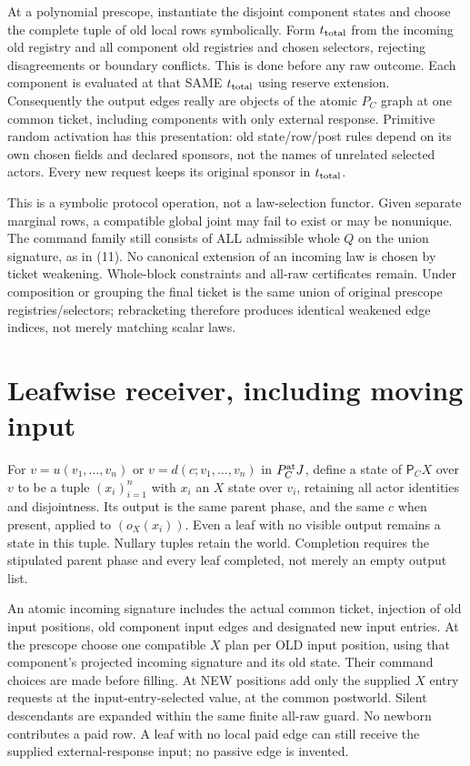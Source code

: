 \documentclass[11pt]{article}
\begin{document}
At a polynomial prescope, instantiate the disjoint component states and choose the complete tuple of old local rows symbolically. Form $t_{\rm total}$ from the incoming old registry and all component old registries and chosen selectors, rejecting disagreements or boundary conflicts. This is done before any raw outcome. Each component is evaluated at that SAME $t_{\rm total}$ using reserve extension. Consequently the output edges really are objects of the atomic $P_C$ graph at one common ticket, including components with only external response. Primitive random activation has this presentation: old state/row/post rules depend on its own chosen fields and declared sponsors, not the names of unrelated selected actors. Every new request keeps its original sponsor in $t_{\rm total}$.

This is a symbolic protocol operation, not a law-selection functor. Given separate marginal rows, a compatible global joint may fail to exist or may be nonunique. The command family still consists of ALL admissible whole $Q$ on the union signature, as in (11). No canonical extension of an incoming law is chosen by ticket weakening. Whole-block constraints and all-raw certificates remain. Under composition or grouping the final ticket is the same union of original prescope registries/selectors; rebracketing therefore produces identical weakened edge indices, not merely matching scalar laws.

\section{Leafwise receiver, including moving input}
For $v=u(v_1,\ldots,v_n)$ or $v=d(c;v_1,\ldots,v_n)$ in $P_C^{\rm at}J$, define a state of $\mathsf P_CX$ over $v$ to be a tuple $(x_i)_{i=1}^n$ with $x_i$ an $X$ state over $v_i$, retaining all actor identities and disjointness. Its output is the same parent phase, and the same $c$ when present, applied to $(o_X(x_i))$. Even a leaf with no visible output remains a state in this tuple. Nullary tuples retain the world. Completion requires the stipulated parent phase and every leaf completed, not merely an empty output list.

An atomic incoming signature includes the actual common ticket, injection of old input positions, old component input edges and designated new input entries. At the prescope choose one compatible $X$ plan per OLD input position, using that component's projected incoming signature and its old state. Their command choices are made before filling. At NEW positions add only the supplied $X$ entry requests at the input-entry-selected value, at the common postworld. Silent descendants are expanded within the same finite all-raw guard. No newborn contributes a paid row. A leaf with no local paid edge can still receive the supplied external-response input; no passive edge is invented.
\end{document}
